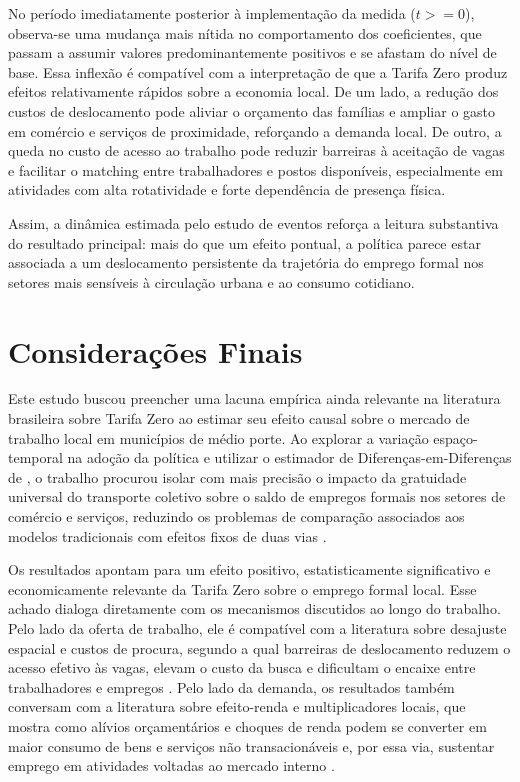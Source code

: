 \documentclass[12pt, a4paper]{article}
\begin{document}
No período imediatamente posterior à implementação da medida ($t >= 0$), observa-se uma mudança mais nítida no comportamento dos coeficientes, que passam a assumir valores predominantemente positivos e se afastam do nível de base.
Essa inflexão é compatível com a interpretação de que a Tarifa Zero produz efeitos relativamente rápidos sobre a economia local.
De um lado, a redução dos custos de deslocamento pode aliviar o orçamento das famílias e ampliar o gasto em comércio e serviços de proximidade, reforçando a demanda local.
De outro, a queda no custo de acesso ao trabalho pode reduzir barreiras à aceitação de vagas e facilitar o matching entre trabalhadores e postos disponíveis, especialmente em atividades com alta rotatividade e forte dependência de presença física.

Assim, a dinâmica estimada pelo estudo de eventos reforça a leitura substantiva do resultado principal: mais do que um efeito pontual, a política parece estar associada a um deslocamento persistente da trajetória do emprego formal nos setores mais sensíveis à circulação urbana e ao consumo cotidiano.

\section{Considerações Finais}
Este estudo buscou preencher uma lacuna empírica ainda relevante na literatura brasileira sobre Tarifa Zero ao estimar seu efeito causal sobre o mercado de trabalho local em municípios de médio porte.
Ao explorar a variação espaço-temporal na adoção da política e utilizar o estimador de Diferenças-em-Diferenças de \citet{CallawaySantanna2021}, o trabalho procurou isolar com mais precisão o impacto da gratuidade universal do transporte coletivo sobre o saldo de empregos formais nos setores de comércio e serviços, reduzindo os problemas de comparação associados aos modelos tradicionais com efeitos fixos de duas vias \citep{DechaisematinDhaultfoeuille2020, goodman2021, rothsantannabilinskipoe2023}.

Os resultados apontam para um efeito positivo, estatisticamente significativo e economicamente relevante da Tarifa Zero sobre o emprego formal local.
Esse achado dialoga diretamente com os mecanismos discutidos ao longo do trabalho.
Pelo lado da oferta de trabalho, ele é compatível com a literatura sobre desajuste espacial e custos de procura, segundo a qual barreiras de deslocamento reduzem o acesso efetivo às vagas, elevam o custo da busca e dificultam o encaixe entre trabalhadores e empregos \citep{kain1968, gobilonselodzenou2007, zenou2009}.
Pelo lado da demanda, os resultados também conversam com a literatura sobre efeito-renda e multiplicadores locais, que mostra como alívios orçamentários e choques de renda podem se converter em maior consumo de bens e serviços não transacionáveis e, por essa via, sustentar emprego em atividades voltadas ao mercado interno \citep{moretti2010, GerardNaritomiSilva2021, CorbiPapaionnouSurico2019}.
\end{document}
